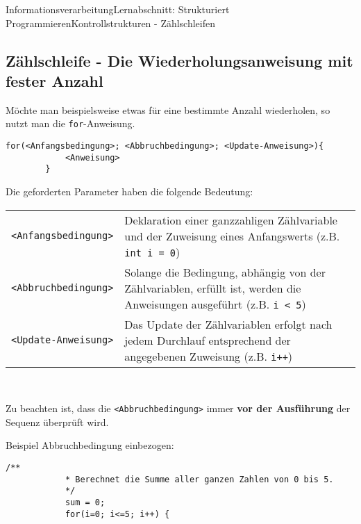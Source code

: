 \documentclass[11pt,oneside,openany,headings=optiontotoc,11pt,numbers=noenddot]{article}
\begin{document}
	\begin{worksheet}{Informationsverarbeitung}{Lernabschnitt: Strukturiert Programmieren}{Kontrollstrukturen - Zählschleifen}
		\setlength{\columnseprule}{0pt}
		\noindent
		\setcounter{section}{6}
		\setcounter{subsection}{4}
		\setcounter{page}{25}
		\vspace*{-35pt}
		\subsection{Zählschleife - Die Wiederholungsanweisung mit fester Anzahl}
		Möchte man beispielsweise etwas für eine bestimmte Anzahl wiederholen, so nutzt man die \lstinline[style=JavaInputStyle]|for|-Anweisung.
		\begin{lstlisting}[style=JavaInputStyle]
		for(<Anfangsbedingung>; <Abbruchbedingung>; <Update-Anweisung>){
			<Anweisung>
		}
		\end{lstlisting}
		\par\bigskip\noindent
		Die geforderten Parameter haben die folgende Bedeutung:\\
		\begin{tabularx}{\textwidth}{lX}
			{\lstinline[style=JavaInputStyle]|<Anfangsbedingung>|} & Deklaration einer ganzzahligen Zählvariable und der Zuweisung eines Anfangswerts (z.B. {\lstinline[style=JavaInputStyle]|int i = 0|})\\
			{\lstinline[style=JavaInputStyle]|<Abbruchbedingung>|} & Solange die Bedingung, abhängig von der Zählvariablen, erfüllt ist, werden die Anweisungen ausgeführt (z.B. {\lstinline[style=JavaInputStyle]|i < 5|})\\
			{\lstinline[style=JavaInputStyle]|<Update-Anweisung>|} & Das Update der Zählvariablen erfolgt nach jedem Durchlauf entsprechend der angegebenen Zuweisung (z.B. {\lstinline[style=JavaInputStyle]|i++|})
		\end{tabularx}\\
		\par\noindent
		Zu beachten ist, dass die {\lstinline[style=JavaInputStyle]|<Abbruchbedingung>|} immer \textbf{vor der Ausführung} der Sequenz überprüft wird.
		\par\noindent
		\begin{minipage}[t]{0.48\textwidth}
			\vspace*{0pt}
			Beispiel Abbruchbedingung einbezogen:
			\begin{lstlisting}[style=JavaInputStyle,frame=single]
			/**
			* Berechnet die Summe aller ganzen Zahlen von 0 bis 5.
			*/
			sum = 0;
			for(i=0; i<=5; i++) {

\end{lstlisting}
\end{minipage}
\end{worksheet}
\end{document}
